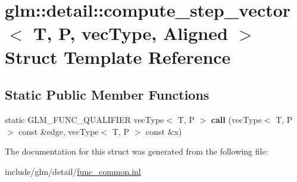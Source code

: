 \hypertarget{structglm_1_1detail_1_1compute__step__vector}{}\section{glm\+:\+:detail\+:\+:compute\+\_\+step\+\_\+vector$<$ T, P, vec\+Type, Aligned $>$ Struct Template Reference}
\label{structglm_1_1detail_1_1compute__step__vector}
\subsection*{Static Public Member Functions}
\begin{DoxyCompactItemize}
\item 
\mbox{\label{structglm_1_1detail_1_1compute__step__vector_a4ee392cb63cb279a55f5ca3cb5d4a392}} 
static G\+L\+M\+\_\+\+F\+U\+N\+C\+\_\+\+Q\+U\+A\+L\+I\+F\+I\+ER vec\+Type$<$ T, P $>$ {\bfseries call} (vec\+Type$<$ T, P $>$ const \&edge, vec\+Type$<$ T, P $>$ const \&x)
\end{DoxyCompactItemize}


The documentation for this struct was generated from the following file\+:\begin{DoxyCompactItemize}
\item 
include/glm/detail/\hyperlink{func__common_8inl}{func\+\_\+common.\+inl}\end{DoxyCompactItemize}
